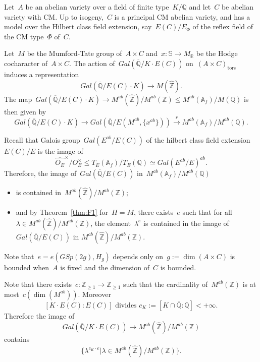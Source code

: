 \documentclass[12pt]{amsart}
\newcommand{\tors}{{\text{tors}}}
\newcommand{\R}{{\mathbb R}}
\newcommand{\Z}{{\mathbb Z}}
\newcommand{\Q}{{\mathbb Q}}
\newcommand{\A}{{\mathbb A}}
\newcommand{\ol}{\overline}
\newcommand{\wh}{\widehat}
\begin{document}
Let~$A$ be an abelian variety over a field of finite type~$K/\Q$ and let~$C$ be abelian variety with CM. Up to isogeny,~$C$ is a principal CM abelian variety, and has a model over the Hilbert class field extension, say~$E(C)/E_\Phi$ of the reflex field of the CM type~$\Phi$ of~$C$.

Let~$M$ be the Mumford-Tate group of~$A\times C$ and~$x:\mathbb{S}\to M_\R$ be the Hodge cocharacter of~$ A\times C$. The action of~$Gal(\ol{\Q}/K\cdot E(C))$ on~$(A\times C)_{\tors}$ induces a representation
\[
Gal(\ol{\Q}/E(C)\cdot K)\to M(\wh{\Z}).
\]
The map~$Gal(\ol{\Q}/E(C)\cdot K)\to M^{ab}(\wh{\Z})/M^{ab}(\Z)\leq M^{ab}({\A_f})/M(\Q)$ is then given by
\[
Gal(\ol{\Q}/E(C)\cdot K)\to Gal(\ol{\Q}/E(M^{ab},\{x^{ab}\}))\xrightarrow{r} M^{ab}({\A_f})/M^{ab}(\Q).
\]

Recall that Galois group~$Gal(E^{ab}/E(C))$ of the hilbert class field extension~$E(C)/E$ is the image of
\[
\wh{O_{E}}^\times/O_E^{\times}\leq T_E(\A_f)/T_E(\Q)\simeq Gal(E^{ab}/E)^{ab}.
\]
Therefore, the image of~$Gal(\ol{\Q}/E(C))$ in~$M^{ab}({\A_f})/M^{ab}(\Q)$
\begin{itemize}
\item is contained in~$M^{ab}(\wh{\Z})/M^{ab}(\Z)$;
\item and by Theorem~\ref{thm:F1} for~$H=M$, there exists~$e$ such that for
all~$\lambda\in M^{ab}(\wh{\Z})/M^{ab}(\Z)$,
the element~$\lambda^e$ is contained in the image of~$Gal(\ol{\Q}/E(C))$ in $M^{ab}(\wh{\Z})/M^{ab}(\Z)$.
\end{itemize}
Note that~$e=e(GSp(2g),H_g)$ depends only on~$g:=\dim(A\times C)$ is bounded when~$A$ is fixed and the dimension of~$C$ is bounded.
 
Note that there exists~$c:\Z_{\geq1}\to \Z_{\geq1}$ such that the cardinality of~$M^{ab}(\Z)$ is at most~$c(\dim(M^{ab}))$. Moreover~
\[
[K\cdot E(C):E(C)]\text{ divides } 
c_K:=[K\cap \ol{\Q}:\Q]<+\infty.
\]
Therefore the image of
\[
Gal(\ol{\Q}/K\cdot E(C))\to M^{ab}(\wh{\Z})/M^{ab}(\Z)
\] 
contains
\[
\{\lambda^{c_K\cdot e}|\lambda \in M^{ab}(\wh{\Z})/M^{ab}(\Z)\}.
\]
\end{document}
